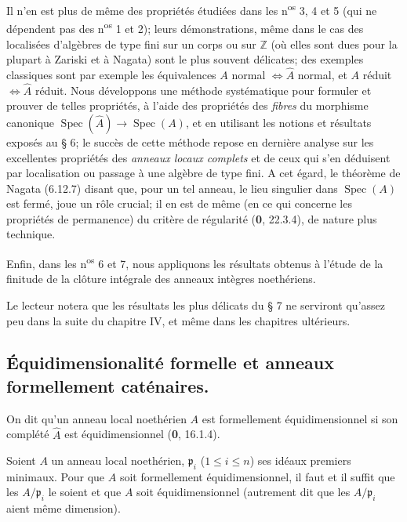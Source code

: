 Il n'en est plus de même des propriétés étudiées dans les
n\textsuperscript{os} 3, 4 et 5 (qui ne dépendent pas des
n\textsuperscript{os} 1 et 2); leurs démonstrations, même dans le cas des
localisées d'algèbres de type fini sur un corps ou sur $\mathbb Z$ (où elles
sont dues pour la plupart à Zariski et à Nagata) sont le plus souvent
délicates; des exemples classiques sont par exemple les équivalences
$A$ normal $\Longleftrightarrow \widehat A$ normal, et $A$ réduit
$\Longleftrightarrow \widehat A$ réduit. Nous développons une méthode
systématique pour formuler et prouver de telles propriétés, à l'aide des
propriétés des \emph{fibres} du morphisme canonique
$\operatorname{Spec}(\widehat A)\to\operatorname{Spec}(A)$, et en utilisant
les notions et résultats exposés au § 6; le succès de cette méthode repose en
dernière analyse sur les excellentes propriétés des \emph{anneaux locaux
complets} et
de ceux qui s'en déduisent par localisation ou passage à une algèbre de type
fini. A cet égard, le théorème de Nagata (6.12.7) disant que, pour un tel
anneau, le lieu singulier dans $\operatorname{Spec}(A)$ est fermé, joue un rôle
crucial; il en est de même (en ce qui concerne les propriétés de permanence)
du critère de régularité (\textbf{0}, 22.3.4), de nature plus technique.

Enfin, dans les n\textsuperscript{os} 6 et 7, nous appliquons les résultats
obtenus à l'étude de
la finitude de la clôture intégrale des anneaux intègres noethériens.

Le lecteur notera que les résultats les plus délicats du § 7 ne serviront
qu'assez peu dans la suite du chapitre IV, et même dans les chapitres
ultérieurs.

\subsection{Équidimensionalité formelle et anneaux formellement caténaires.}
\label{subsection:IV.7.1-fr}

\begin{definition}[7.1.1]
\label{IV.2.s7.1.1-fr}
On dit qu'un anneau local noethérien $A$ est formellement
équidimensionnel si son complété $\widehat A$ est équidimensionnel \textup{(\textbf{0},
16.1.4)}.
\end{definition}

\begin{proposition}[7.1.2]
\label{IV.2.s7.1.2-fr}
Soient $A$ un anneau local noethérien, $\mathfrak p_i$ \textup{(}$1\leqslant i\leqslant
n$\textup{)} ses idéaux premiers minimaux. Pour que $A$ soit formellement
équidimensionnel, il faut et il suffit que les $A/\mathfrak p_i$ le soient et
que $A$ soit équidimensionnel \textup{(autrement dit que les $A/\mathfrak p_i$ aient
même dimension)}.
\end{proposition}

